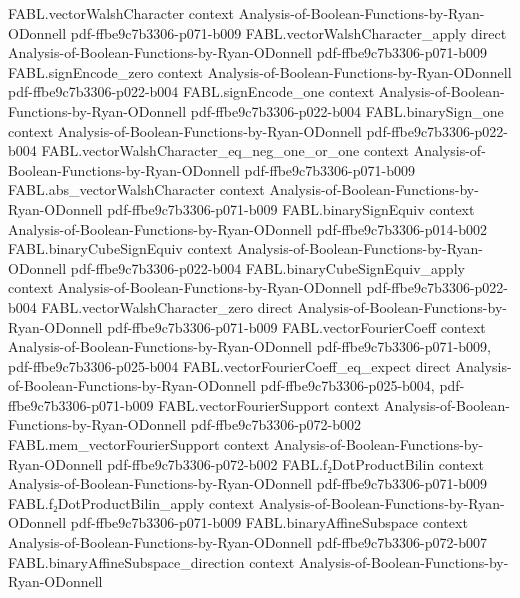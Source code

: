 \begin{theorem}
  {FABL.vectorWalshCharacter}
  {context}
  {Analysis-of-Boolean-Functions-by-Ryan-ODonnell}
  {pdf-ffbe9c7b3306-p071-b009}
\proofstep
  {FABL.vectorWalshCharacter_apply}
  {direct}
  {Analysis-of-Boolean-Functions-by-Ryan-ODonnell}
  {pdf-ffbe9c7b3306-p071-b009}
\proofstep
  {FABL.signEncode_zero}
  {context}
  {Analysis-of-Boolean-Functions-by-Ryan-ODonnell}
  {pdf-ffbe9c7b3306-p022-b004}
\proofstep
  {FABL.signEncode_one}
  {context}
  {Analysis-of-Boolean-Functions-by-Ryan-ODonnell}
  {pdf-ffbe9c7b3306-p022-b004}
\proofstep
  {FABL.binarySign_one}
  {context}
  {Analysis-of-Boolean-Functions-by-Ryan-ODonnell}
  {pdf-ffbe9c7b3306-p022-b004}
\proofstep
  {FABL.vectorWalshCharacter_eq_neg_one_or_one}
  {context}
  {Analysis-of-Boolean-Functions-by-Ryan-ODonnell}
  {pdf-ffbe9c7b3306-p071-b009}
\proofstep
  {FABL.abs_vectorWalshCharacter}
  {context}
  {Analysis-of-Boolean-Functions-by-Ryan-ODonnell}
  {pdf-ffbe9c7b3306-p071-b009}
\proofstep
  {FABL.binarySignEquiv}
  {context}
  {Analysis-of-Boolean-Functions-by-Ryan-ODonnell}
  {pdf-ffbe9c7b3306-p014-b002}
\proofstep
  {FABL.binaryCubeSignEquiv}
  {context}
  {Analysis-of-Boolean-Functions-by-Ryan-ODonnell}
  {pdf-ffbe9c7b3306-p022-b004}
\proofstep
  {FABL.binaryCubeSignEquiv_apply}
  {context}
  {Analysis-of-Boolean-Functions-by-Ryan-ODonnell}
  {pdf-ffbe9c7b3306-p022-b004}
\proofstep
  {FABL.vectorWalshCharacter_zero}
  {direct}
  {Analysis-of-Boolean-Functions-by-Ryan-ODonnell}
  {pdf-ffbe9c7b3306-p071-b009}
\proofstep
  {FABL.vectorFourierCoeff}
  {context}
  {Analysis-of-Boolean-Functions-by-Ryan-ODonnell}
  {pdf-ffbe9c7b3306-p071-b009,
    pdf-ffbe9c7b3306-p025-b004}
\proofstep
  {FABL.vectorFourierCoeff_eq_expect}
  {direct}
  {Analysis-of-Boolean-Functions-by-Ryan-ODonnell}
  {pdf-ffbe9c7b3306-p025-b004,
    pdf-ffbe9c7b3306-p071-b009}
\proofstep
  {FABL.vectorFourierSupport}
  {context}
  {Analysis-of-Boolean-Functions-by-Ryan-ODonnell}
  {pdf-ffbe9c7b3306-p072-b002}
\proofstep
  {FABL.mem_vectorFourierSupport}
  {context}
  {Analysis-of-Boolean-Functions-by-Ryan-ODonnell}
  {pdf-ffbe9c7b3306-p072-b002}
\proofstep
  {FABL.f₂DotProductBilin}
  {context}
  {Analysis-of-Boolean-Functions-by-Ryan-ODonnell}
  {pdf-ffbe9c7b3306-p071-b009}
\proofstep
  {FABL.f₂DotProductBilin_apply}
  {context}
  {Analysis-of-Boolean-Functions-by-Ryan-ODonnell}
  {pdf-ffbe9c7b3306-p071-b009}
\proofstep
  {FABL.binaryAffineSubspace}
  {context}
  {Analysis-of-Boolean-Functions-by-Ryan-ODonnell}
  {pdf-ffbe9c7b3306-p072-b007}
\proofstep
  {FABL.binaryAffineSubspace_direction}
  {context}
  {Analysis-of-Boolean-Functions-by-Ryan-ODonnell}

\end{theorem}
